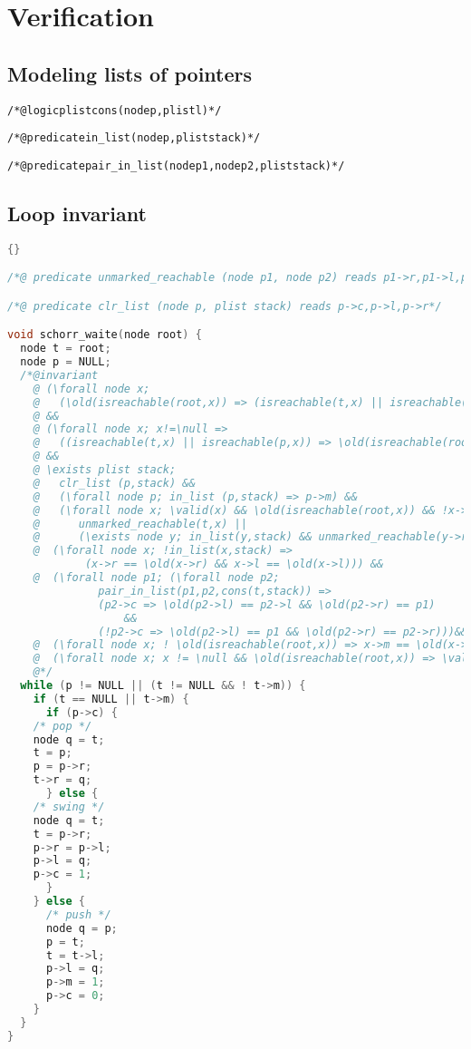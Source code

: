 
\section{Verification}
\label{sec:proof}

\subsection{Modeling lists of pointers}

\begin{alltt}

\begin{slshape}
/*@ logic plist cons(node p, plist l) */

/*@ predicate in_list(node p,plist stack) */

/*@ predicate pair_in_list(node p1,node p2, plist stack) */
\end{slshape}
\end{alltt}


\subsection{Loop invariant}

\begin{lstlisting}[language=C]{}

/*@ predicate unmarked_reachable (node p1, node p2) reads p1->r,p1->l,p1->m */

/*@ predicate clr_list (node p, plist stack) reads p->c,p->l,p->r*/

void schorr_waite(node root) {
  node t = root;
  node p = NULL;
  /*@invariant
    @ (\forall node x; 
    @   (\old(isreachable(root,x)) => (isreachable(t,x) || isreachable(p,x))))
    @ &&
    @ (\forall node x; x!=\null => 
    @   ((isreachable(t,x) || isreachable(p,x)) => \old(isreachable(root,x)))) 
    @ &&
    @ \exists plist stack;
    @   clr_list (p,stack) &&
    @   (\forall node p; in_list (p,stack) => p->m) &&
    @   (\forall node x; \valid(x) && \old(isreachable(root,x)) && !x->m =>
    @      unmarked_reachable(t,x) || 
    @      (\exists node y; in_list(y,stack) && unmarked_reachable(y->r,x))) &&
    @  (\forall node x; !in_list(x,stack) =>  
            (x->r == \old(x->r) && x->l == \old(x->l))) &&
    @  (\forall node p1; (\forall node p2;
              pair_in_list(p1,p2,cons(t,stack)) => 
	          (p2->c => \old(p2->l) == p2->l && \old(p2->r) == p1)
                  &&
	          (!p2->c => \old(p2->l) == p1 && \old(p2->r) == p2->r)))&&
    @  (\forall node x; ! \old(isreachable(root,x)) => x->m == \old(x->m)) &&
    @  (\forall node x; x != \null && \old(isreachable(root,x)) => \valid(x)) 
    @*/
  while (p != NULL || (t != NULL && ! t->m)) {
    if (t == NULL || t->m) {
      if (p->c) {
	/* pop */
	node q = t;
	t = p;
	p = p->r;
	t->r = q;
      } else {
	/* swing */
	node q = t;
	t = p->r;
	p->r = p->l;
	p->l = q;
	p->c = 1;
      }
    } else {
      /* push */
      node q = p;
      p = t;
      t = t->l;
      p->l = q;
      p->m = 1;
      p->c = 0;
    }
  }
}
\end{lstlisting}

